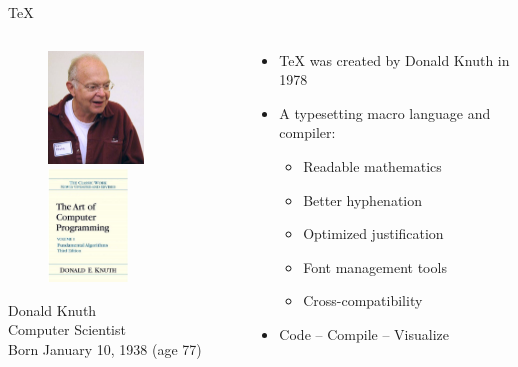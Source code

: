 \documentclass{beamer}
\begin{document}
\begin{frame}{\TeX{}}
	\begin{columns}
		\begin{column}{4cm}
			\begin{figure}
   				\includegraphics[height=3cm]{384px-KnuthAtOpenContentAlliance.jpg}
   				\includegraphics[height=3cm]{ArtOfComputerProgramming.jpg}
			\end{figure}
			\begin{center}
				\tiny
				Donald Knuth \\
				Computer Scientist \\
				Born January 10, 1938 (age 77) \\
			\end{center}
		\end{column}
		\begin{column}{6cm}
			\begin{itemize}
				\item \TeX{} was created by Donald Knuth in 1978
				\pause
				\item A typesetting macro language and compiler:
				\begin{itemize}
					\item Readable mathematics
					\item Better hyphenation
					\item Optimized justification
					\item Font management tools
					\item Cross-compatibility
				\end{itemize}
				\pause
				\item Code -- Compile -- Visualize
			\end{itemize}
		\end{column}
	\end{columns}
\end{frame}
\end{document}
